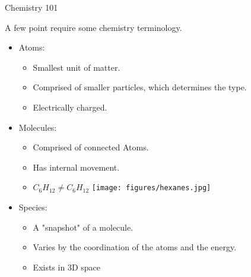 \begin{frame}{Chemistry 101}

A few point require some chemistry terminology.

\vspace{0.5cm}

 \begin{itemize}
  \item Atoms:
  \begin{itemize}
  	\item Smallest unit of matter.
  	\item Comprised of smaller particles, which determines the type.
  	\item Electrically charged.
  \end{itemize}
  \item Molecules:
  \begin{itemize}
  	\item Comprised of connected Atoms.
	\item Has internal movement.
	\item $C_6H_12 \neq C_6H_12$ \hspace{0.4cm}
	\texttt{[image: figures/hexanes.jpg]}
  \end{itemize}
  \item Species:
  \begin{itemize}
  	\item A "snapshot" of a molecule.
  	\item Varies by the coordination of the atoms and the energy.
  	\item Exists in 3D space
  \end{itemize}

 \end{itemize}
 
\end{frame}


